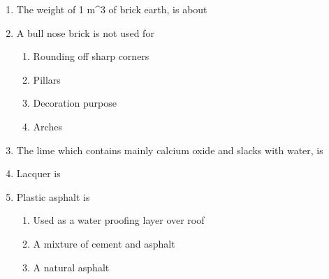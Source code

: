\documentclass[11pt,a4paper]{article}
\begin{document}
\begin{enumerate}
\item{The weight of 1 m\^{}3 of brick earth, is about}
\\
\item{A bull nose brick is not used for}
\begin{enumerate}[label=\Alph*.]
\item{Rounding off sharp corners}
\item{Pillars}
\item{Decoration purpose}
\item{Arches}
\end{enumerate}
\item{The lime which contains mainly calcium oxide and slacks with water, is}
\\
\item{Lacquer is}
\\
\item{Plastic asphalt is}
\begin{enumerate}[label=\Alph*.]
\item{Used as a water proofing layer over roof}
\item{A mixture of cement and asphalt}
\item{A natural asphalt}

\end{enumerate}
\end{enumerate}
\end{document}
